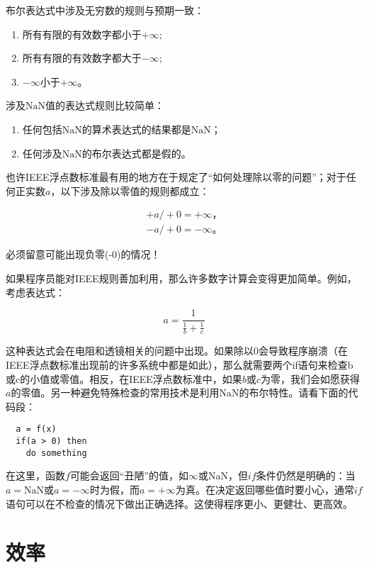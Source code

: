 \documentclass[lang=cn,12pt]{elegantbook}
\begin{document}
布尔表达式中涉及无穷数的规则与预期一致：

\begin{enumerate}
  \item 所有有限的有效数字都小于$+\infty$;
  \item 所有有限的有效数字都大于$-\infty$;
  \item $-\infty$小于$+\infty$。
\end{enumerate}

涉及$\mathrm{NaN}$值的表达式规则比较简单：

\begin{enumerate}
  \item 任何包括$\mathrm{NaN}$的算术表达式的结果都是$\mathrm{NaN}$；
  \item 任何涉及$\mathrm{NaN}$的布尔表达式都是假的。
\end{enumerate}

也许IEEE浮点数标准最有用的地方在于规定了“如何处理除以零的问题”；对于任何正实数$a$，以下涉及除以零值的规则都成立：

\[
  \begin{aligned}
    +a /+0=+\infty， \\
    -a /+0=-\infty。
  \end{aligned}
\]

\begin{note}
  必须留意可能出现负零(-0)的情况！
\end{note}

如果程序员能对IEEE规则善加利用，那么许多数字计算会变得更加简单。例如，考虑表达式：

\[a=\frac{1}{\frac{1}{b}+\frac{1}{c}}\]

这种表达式会在电阻和透镜相关的问题中出现。如果除以0会导致程序崩溃（在IEEE浮点数标准出现前的许多系统中都是如此），那么就需要两个if语句来检查b或c的小值或零值。相反，在IEEE浮点数标准中，如果$b$或$c$为零，我们会如愿获得$a$的零值。另一种避免特殊检查的常用技术是利用$\mathrm{NaN}$的布尔特性。请看下面的代码段：

\begin{lstlisting}
  a = f(x)
  if(a > 0) then
    do something
\end{lstlisting}

在这里，函数$f$可能会返回“丑陋”的值，如$\infty$或$\mathrm{NaN}$，但$if$条件仍然是明确的：当$a=\mathrm{NaN}$或$a=-\infty$时为假，而$a=+\infty$为真。在决定返回哪些值时要小心，通常$if$语句可以在不检查的情况下做出正确选择。这使得程序更小、更健壮、更高效。

\section{效率}
\end{document}
